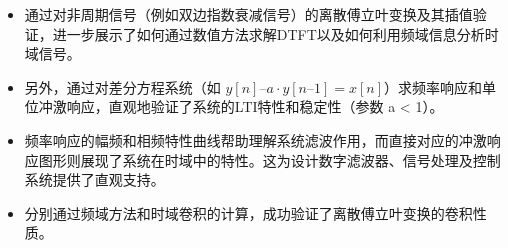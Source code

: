 \documentclass[12pt,a4paper,UTF8]{article}
\providecommand{\tightlist}{%
      \setlength{\itemsep}{0pt}\setlength{\parskip}{0pt}}
\begin{document}
\begin{enumerate}
  \begin{itemize}
  \tightlist
  \item
    通过对非周期信号（例如双边指数衰减信号）的离散傅立叶变换及其插值验证，进一步展示了如何通过数值方法求解DTFT以及如何利用频域信息分析时域信号。
  \item
    另外，通过对差分方程系统（如
    \(y[n] – a·y[n–1] = x[n]\)）求频率响应和单位冲激响应，直观地验证了系统的LTI特性和稳定性（参数
    \textbar a\textbar{} \textless{} 1）。\\
  \item
    频率响应的幅频和相频特性曲线帮助理解系统滤波作用，而直接对应的冲激响应图形则展现了系统在时域中的特性。这为设计数字滤波器、信号处理及控制系统提供了直观支持。
  \item
    分别通过频域方法和时域卷积的计算，成功验证了离散傅立叶变换的卷积性质。
  \end{itemize}
\end{enumerate}


    
    
    
\end{document}
